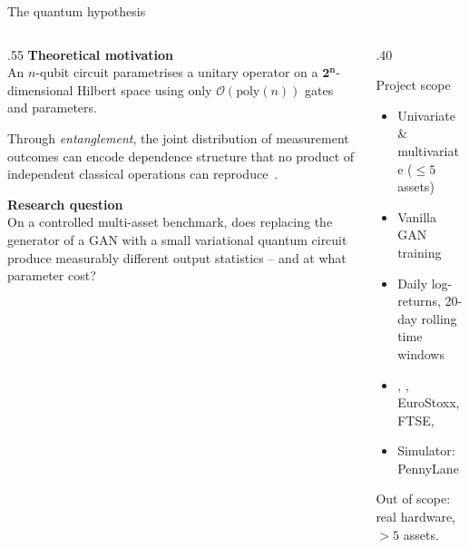 \begin{frame}{The quantum hypothesis}
    \begin{columns}[T]
    \begin{column}{.55\textwidth}
        \textbf{Theoretical motivation}\\
        An $n$-qubit circuit parametrises a unitary operator on a
        $\mathbf{2^n}$-dimensional Hilbert space using only
        $\mathcal{O}(\text{poly}(n))$ gates and parameters.
        \medskip

        Through \emph{entanglement}, the joint distribution of
        measurement outcomes can encode dependence structure that
        no product of independent classical operations can
        reproduce~\cite{Zoufal2019QGAN, Coyle2021QvsClassical}.
        \medskip

        \textbf{Research question}\\
        On a controlled multi-asset benchmark, does replacing the
        generator of a GAN with a small variational quantum
        circuit produce measurably different output statistics
        -- and at what parameter cost?
    \end{column}
    \hfill
    \begin{column}{.40\textwidth}
        \begin{block}{Project scope}
            \begin{itemize}
                \item Univariate \& multivariate ($\leq 5$
                assets)
                \item Vanilla GAN training~\cite{Goodfellow2014GAN}
                \item Daily log-returns, 20-day rolling time windows
                \item \smi, \dax, EuroStoxx, FTSE, \sap
                \item Simulator: PennyLane
                \cite{Bergholm2018PennyLane}
            \end{itemize}
        \end{block}
        \medskip

        Out of scope: real hardware, $> 5$ assets.
    \end{column}
    \end{columns}
\end{frame}
